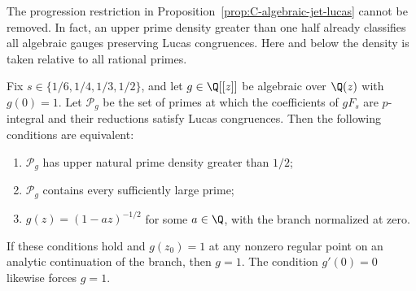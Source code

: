 The progression restriction in Proposition~\ref{prop:C-algebraic-jet-lucas}
cannot be removed. In fact, an upper prime density greater than one half
already classifies all algebraic gauges preserving Lucas congruences.
Here and below the density is taken relative to all rational primes.

\begin{theorem}
\label{thm:C-majority-lucas-gauges}
Fix $s\in\{1/6,1/4,1/3,1/2\}$, and let
$g\in\Q[[z]]$ be algebraic over $\Q(z)$ with $g(0)=1$.
Let $\mathcal P_g$ be the set of primes at which the coefficients of
$gF_s$ are $p$-integral and their reductions satisfy Lucas congruences.
Then the following conditions are equivalent:
\begin{enumerate}
\item $\mathcal P_g$ has upper natural prime density greater than $1/2$;
\item $\mathcal P_g$ contains every sufficiently large prime;
\item $g(z)=(1-az)^{-1/2}$ for some $a\in\Q$, with the branch
normalized at zero.
\end{enumerate}
If these conditions hold and $g(z_0)=1$ at any nonzero regular point
on an analytic continuation of the branch, then $g=1$.
The condition $g'(0)=0$ likewise forces $g=1$.
\end{theorem}
